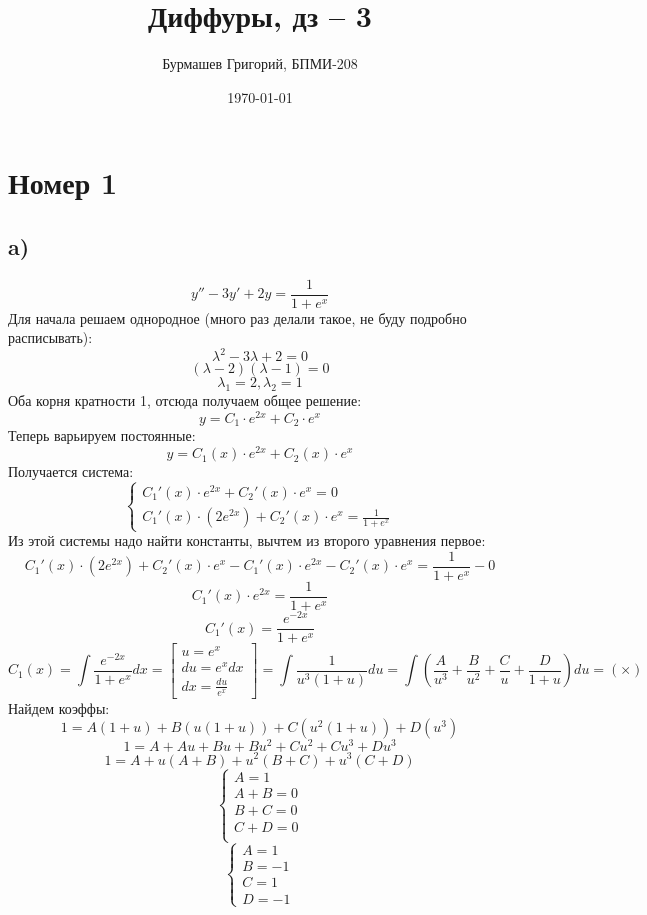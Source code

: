 \documentclass[a4paper,12pt]{article}
\author{Бурмашев Григорий, БПМИ-208}
\title{Диффуры, дз -- 3}
\date{\today}
\begin{document}
\maketitle
\clearpage
\section*{Номер 1}
\subsection*{a)}
\[
y'' - 3y' + 2y = \frac{1}{1 + e^x}
\]
Для начала решаем однородное (много раз делали такое, не буду подробно расписывать):
\[
\lambda^2 - 3 \lambda + 2 = 0 
\]
\[
(\lambda - 2)(\lambda - 1) = 0
\]
\[
\lambda_1 = 2, \lambda_2 = 1
\]
Оба корня кратности 1, отсюда получаем общее решение:
\[
y = C_1 \cdot e^{2x} + C_2 \cdot e^{x}
\]
Теперь варьируем постоянные:
\[
y = C_1(x) \cdot e^{2x} + C_2(x) \cdot e^{x}
\]
Получается система:
\[
\begin{cases}
C_1'(x) \cdot e^{2x}+ C_2'(x) \cdot e^{x}= 0 \\ 
C_1'(x) \cdot (2 e^{2x})+ C_2'(x)  \cdot e^{x}=  \frac{1}{1 + e^x}
\end{cases}
\]
Из этой системы надо найти константы, вычтем из второго уравнения первое:
\[
C_1'(x) \cdot (2 e^{2x})+ C_2'(x)  \cdot e^{x} - C_1'(x) \cdot e^{2x} - C_2'(x) \cdot e^{x}=  \frac{1}{1 + e^x} - 0 
\]
\[
C_1'(x) \cdot e^{2x} = \frac{1}{1 + e^x}
\]
\[
C_1'(x) = \frac{e^{-2x}}{1 + e^x}
\]
\[
C_1(x) = \int \frac{e^{-2x}}{1 + e^x}dx =  \begin{bmatrix}
u = e^x \\
du = e^x dx \\
dx = \frac{du}{e^{x}}
\end{bmatrix} = 
\int \frac{1}{u^3(1 + u)} du = \int \left( \frac{A}{u^3} + \frac{B}{u^2} +  \frac{C}{u} +  \frac{D}{1 + u} \right)du = (\times)
\]
Найдем коэффы:
\[
1 = A(1 + u) + B(u(1 + u)) + C(u^2(1 + u)) + D(u^3)
\]
\[
1 = A + Au  + Bu + Bu^2  + Cu^2 +  Cu^3  + Du^3
\]
\[
1 = A + u(A + B) + u^2(B + C) + u^3(C + D)
\]
\[
\begin{cases}
A = 1 \\
A + B = 0 \\
B + C = 0 \\
C + D = 0 \\
\end{cases}
\]
\[
\begin{cases}
A = 1 \\
B = -1 \\
C = 1 \\
D = -1
\end{cases}
\]
\end{document}
